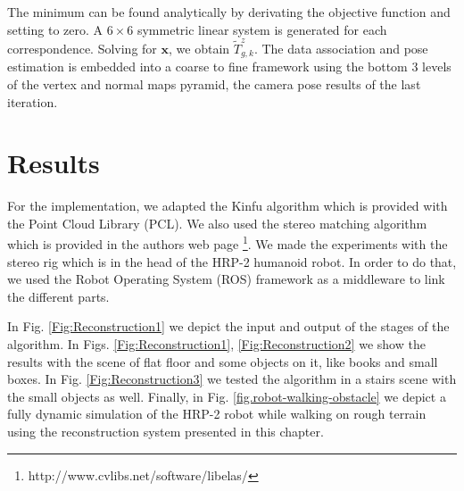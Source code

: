 The minimum can be found analytically by derivating the objective function and setting to zero. A $6 \times 6$ symmetric linear system is generated for each correspondence. Solving for $\mathbf{x}$, we obtain $\tilde{T}^z_{g,k}$.
The data association and pose estimation is embedded into a coarse to fine framework using the bottom 3 levels of the vertex and normal maps pyramid, the camera pose results of the last iteration.

\section{Results}

For the implementation, we adapted the Kinfu algorithm which is provided with the Point Cloud Library (PCL). We also used the stereo matching algorithm which is provided in the authors web page \footnote{http://www.cvlibs.net/software/libelas/}. We made the experiments with the stereo rig which is in the head of the HRP-2 humanoid robot. In order to do that, we used the Robot Operating System (ROS) framework as a middleware to link the different parts.

In Fig. \ref{Fig:Reconstruction1} we depict the input and output of the stages of the algorithm. In Figs. \ref{Fig:Reconstruction1}, \ref{Fig:Reconstruction2} we show the results with the scene of flat floor and some objects on it, like books and small boxes. In Fig. \ref{Fig:Reconstruction3} we tested the algorithm in a stairs scene with the small objects as well. Finally, in Fig. \ref{fig.robot-walking-obstacle} we depict a fully dynamic simulation of the HRP-2 robot while walking on rough terrain using the reconstruction system presented in this chapter.


